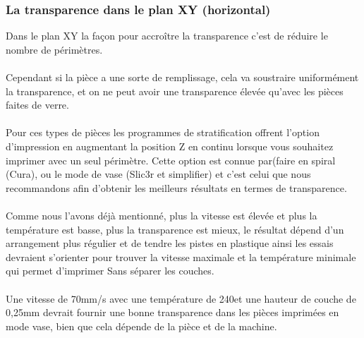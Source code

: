 \documentclass[11pt,a4paper]{article}
\begin{document}
		\subsubsection{La transparence dans le plan XY (horizontal)}Dans le plan XY la façon pour accroître la transparence c’est de réduire le nombre de périmètres.
\\\\
Cependant si la pièce a une sorte de remplissage, cela va soustraire uniformément la transparence, et on ne peut avoir une transparence élevée qu’avec les pièces faites de verre.
\\\\
Pour ces types de pièces les programmes de stratification offrent l’option d’impression en augmentant la position Z en continu lorsque vous souhaitez imprimer avec un seul périmètre. Cette option est connue par(faire en spiral (Cura), ou le mode de vase (Slic3r et simplifier) et c’est celui que nous recommandons afin d’obtenir les meilleurs résultats en termes de transparence.
\\\\
Comme nous l'avons déjà mentionné, plus la vitesse est élevée et plus la température est basse, plus la transparence est mieux, le résultat dépend d'un arrangement plus régulier et de tendre les pistes en plastique ainsi les essais devraient s’orienter pour trouver la vitesse maximale et la température minimale qui permet d'imprimer Sans séparer les couches.
\\\\
Une vitesse de 70mm/s avec une température de 240\degree et une hauteur de couche de 0,25mm devrait fournir une bonne transparence dans les pièces imprimées en mode vase, bien que cela dépende de la pièce et de la machine.
\end{document}
